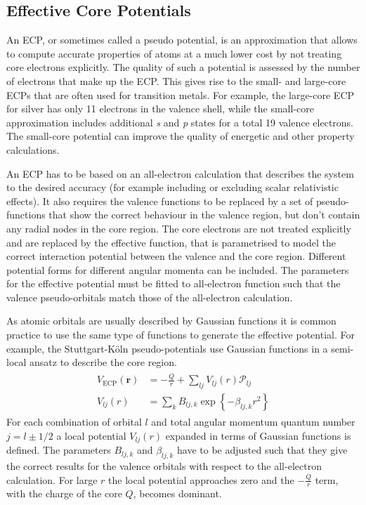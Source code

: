 \subsection{Effective Core Potentials}
\label{sec:ECP}

An \ac{ECP}, or sometimes called a pseudo potential, is an approximation that
allows to compute accurate properties of atoms at a much lower cost by not
treating core electrons explicitly. The quality of such a potential is assessed
by the number of electrons that make up the \ac{ECP}. This gives rise to the
small- and large-core \acp{ECP} that are often used for transition metals. For
example, the large-core \ac{ECP} for silver has only 11 electrons in the
valence shell, while the small-core approximation includes additional
\textit{s} and \textit{p} states for a total 19 valence electrons. The
small-core potential can improve the quality of energetic and other property
calculations.

An \ac{ECP} has to be based on an all-electron calculation that describes the
system to the desired accuracy (for example including or excluding scalar
relativistic effects). It also requires the valence functions to be replaced by
a set of pseudo-functions that show the correct behaviour in the valence
region, but don't contain any radial nodes in the core region. The core
electrons are not treated explicitly and are replaced by the effective
function, that is parametrised to model the correct interaction potential
between the valence and the core region. Different potential forms for
different angular momenta can be included. The parameters for the effective
potential must be fitted to all-electron function such that the valence
pseudo-orbitals match those of the all-electron calculation.

As atomic orbitals are usually described by Gaussian functions it is common
practice to use the same type of functions to generate the effective potential.
For example, the Stuttgart-K\"oln pseudo-potentials use Gaussian functions in
a semi-local ansatz to describe the core region.\autocite{Figgen_Energyconsistentpseudopotentialsgroup_2005}
%
\begin{align}
    \begin{aligned}
        V_\text{ECP}(\mathbf{r})&=-\frac{Q}{r} + \sum_{lj}V_{lj}(r)\mathscr{P}_{lj}\\
        V_{lj}(r)&=\sum_kB_{lj,k}\exp\left\{-\beta_{lj,k}r^2\right\}
    \end{aligned}
\end{align}
%
For each combination of orbital $l$ and total angular momentum quantum number
$j=l\pm 1/2$ a local potential $V_{lj}(r)$ expanded in terms of Gaussian
functions is defined. The parameters $B_{lj,k}$ and $\beta_{lj,k}$ have to be
adjusted such that they give the correct results for the valence orbitals with
respect to the all-electron calculation. For large $r$ the local potential
approaches zero and the $-\frac{Q}{r}$ term, with the charge of the core $Q$,
becomes dominant. 

